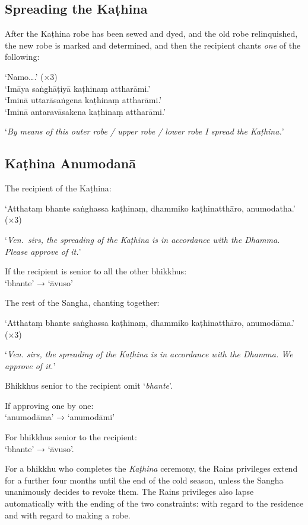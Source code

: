 \subsection{Spreading the Kaṭhina}
\label{spreading-the-kathina}

After the Kaṭhina robe has been sewed and dyed, and the old robe relinquished,
the new robe is marked and determined, and then the recipient chants \emph{one}
of the following:

‘Namo….’ (×3)\\
‘Imāya saṅghāṭiyā kaṭhinaṃ attharāmi.’\\
‘Iminā uttarāsaṅgena kaṭhinaṃ attharāmi.’\\
‘Iminā antaravāsakena kaṭhinaṃ attharāmi.’

‘\emph{By means of this outer robe / upper robe / lower robe I spread the Kaṭhina.}’


\subsection{Kaṭhina Anumodanā}
\label{kathina-anumodana}

The recipient of the Kaṭhina:

‘Atthataṃ bhante saṅghassa kaṭhinaṃ, dhammiko kaṭhinatthāro, anumodatha.’ (×3)

‘\emph{Ven.\ sirs, the spreading of the Kaṭhina is in accordance with the Dhamma.
  Please approve of it.}’

If the recipient is senior to all the other bhikkhus:\\
‘bhante’ → ‘āvuso’

The rest of the Sangha, chanting together:

‘Atthataṃ bhante saṅghassa kaṭhinaṃ, dhammiko kaṭhinatthāro, anumodāma.’ (×3)

‘\emph{Ven. sirs, the spreading of the Kaṭhina is in accordance with the Dhamma.
  We approve of it.}’


Bhikkhus senior to the recipient omit ‘\emph{bhante}’.

\ifhandbookedition
\clearpage
\fi

If approving one by one:\\
‘anumodāma’ → ‘anumodāmi’

For bhikkhus senior to the recipient:\\
‘bhante’ → ‘āvuso’.

For a bhikkhu who completes the \emph{Kaṭhina} ceremony, the Rains privileges
extend for a further four months until the end of the cold season, unless the Sangha unanimously decides to revoke them. The Rains privileges also lapse automatically with the ending of the two constraints: with regard to the residence and with regard to making a robe. 


